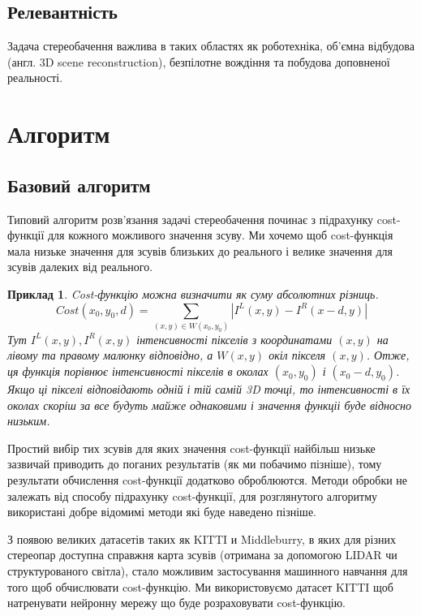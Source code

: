 \documentclass{article}
\newtheorem*{example*}{Приклад}
\theoremstyle{definition}
\begin{document}
\subsection{Релевантність}
Задача стереобачення важлива в таких областях як роботехніка, об'ємна відбудова (англ. 3D scene reconstruction), безпілотне вождіння та побудова доповненої реальності.

\section{Алгоритм}
\subsection{Базовий алгоритм}
Типовий алгоритм розв'язання задачі стереобачення починає з підрахунку cost-функції для кожного можливого значення зсуву. Ми хочемо щоб cost-функція мала низьке значення для зсувів близьких до реального і велике значення для зсувів далеких від реального. 
\begin{example*}
	Cost-функцію можна визначити як суму абсолютних різниць.
	\[ Cost(x_0, y_0, d) = \sum_{(x, y) \in W(x_0,y_0)} \left| I^L(x, y) - I^R(x - d, y) \right| \]
	Тут $I^L(x,y), I^R(x,y)$ інтенсивності пікселів з координатами $(x,y)$ на лівому та правому малюнку відповідно, а $W(x,y)$ окіл пікселя $(x,y)$. Отже, ця функція порівнює інтенсивності пікселів в околах $(x_0, y_0)$ і $(x_0 - d, y_0)$. Якщо ці пікселі відповідають одній і тій самій 3D точці, то інтенсивності в їх околах скоріш за все будуть майже однаковими і значення функціі буде відносно низьким.
\end{example*}

Простий вибір тих зсувів для яких значення cost-функції найбільш низьке зазвичай приводить до поганих результатів (як ми побачимо пізніше), тому результати обчислення cost-функції додатково оброблюются. Методи обробки не залежать від способу підрахунку cost-функції, для розглянутого алгоритму використані добре відомимі методи які буде наведено пізніше.

З появою великих датасетів таких як KITTI и Middleburry, в яких для різних стереопар доступна справжня карта зсувів (отримана за допомогою LIDAR чи структурованого світла), стало можливим застосування машинного навчання для того щоб обчислювати cost-функцію. Ми використовуємо датасет KITTI щоб натренувати нейронну мережу що буде розраховувати cost-функцію.
\end{document}
